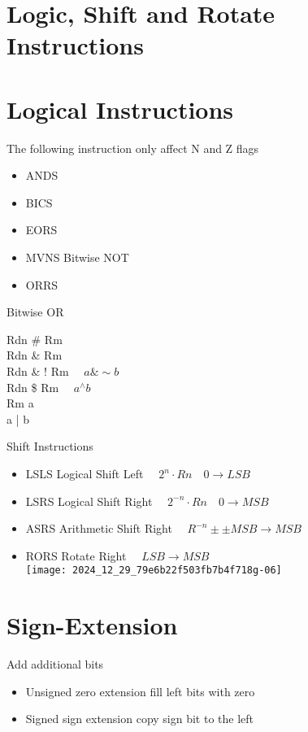 \section{Logic, Shift and Rotate Instructions}

\section*{Logical Instructions}
The following instruction only affect N and Z flags

\begin{itemize}
  \item ANDS
  \item BICS
  \item EORS
  \item MVNS Bitwise NOT
  \item ORRS
\end{itemize}

Bitwise OR

Rdn \# Rm\\
Rdn \& Rm\\
Rdn \& ! Rm $\quad a \& \sim b$\\
Rdn \$ Rm $\quad a{ }^{\wedge} b$\\
Rm a\\
a | b

Shift Instructions

\begin{itemize}
  \item LSLS Logical Shift Left $\quad 2^{n} \cdot R n \quad 0 \rightarrow L S B$
  \item LSRS Logical Shift Right $\quad 2^{-n} \cdot R n \quad 0 \rightarrow M S B$
  \item ASRS Arithmetic Shift Right $\quad R^{-n} \pm \pm M S B \rightarrow M S B$
  \item RORS Rotate Right $\quad L S B \rightarrow M S B$\\
\texttt{[image: 2024\_12\_29\_79e6b22f503fb7b4f718g-06]}
\end{itemize}

\section*{Sign-Extension}
Add additional bits

\begin{itemize}
  \item Unsigned zero extension fill left bits with zero
  \item Signed sign extension copy sign bit to the left
\end{itemize}

